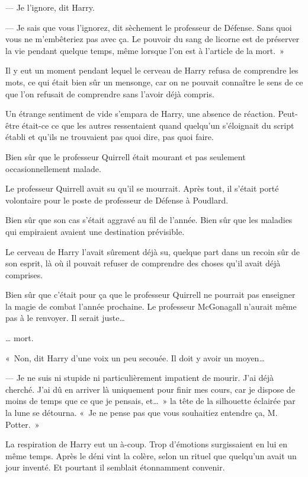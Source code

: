 --- Je l'ignore, dit Harry.

--- Je sais que vous l'ignorez, dit sèchement le professeur de Défense. Sans quoi vous ne m'embêteriez pas avec ça. Le pouvoir du sang de licorne est de préserver la vie pendant quelque temps, même lorsque l'on est à l'article de la mort.~»

Il y eut un moment pendant lequel le cerveau de Harry refusa de comprendre les mots, ce qui était bien sûr un mensonge, car on ne pouvait connaître le sens de ce que l'on refusait de comprendre sans l'avoir déjà compris.

Un étrange sentiment de vide s'empara de Harry, une absence de réaction. Peut-être était-ce ce que les autres ressentaient quand quelqu'un s'éloignait du script établi et qu'ils ne trouvaient pas quoi dire, pas quoi faire.

Bien sûr que le professeur Quirrell était mourant et pas seulement occasionnellement malade.

Le professeur Quirrell avait su qu'il se mourrait. Après tout, il s'était porté volontaire pour le poste de professeur de Défense à Poudlard.

Bien sûr que son cas s'était aggravé au fil de l'année. Bien sûr que les maladies qui empiraient avaient une destination prévisible.

Le cerveau de Harry l'avait sûrement déjà su, quelque part dans un recoin sûr de son esprit, là où il pouvait refuser de comprendre des choses qu'il avait déjà comprises.

Bien sûr que c'était pour ça que le professeur Quirrell ne pourrait pas enseigner la magie de combat l'année prochaine. Le professeur McGonagall n'aurait même pas à le renvoyer. Il serait juste…

… mort.

«~Non, dit Harry d'une voix un peu secouée. Il doit y avoir un moyen…

--- Je ne suis ni stupide ni particulièrement impatient de mourir. J'ai déjà cherché. J'ai dû en arriver là uniquement pour finir mes cours, car je dispose de moins de temps que ce que je pensais, et…~» la tête de la silhouette éclairée par la lune se détourna. «~Je ne pense pas que vous souhaitiez entendre ça, M. Potter.~»

La respiration de Harry eut un à-coup. Trop d'émotions surgissaient en lui en même temps. Après le déni vint la colère, selon un rituel que quelqu'un avait un jour inventé. Et pourtant il semblait étonnamment convenir.

